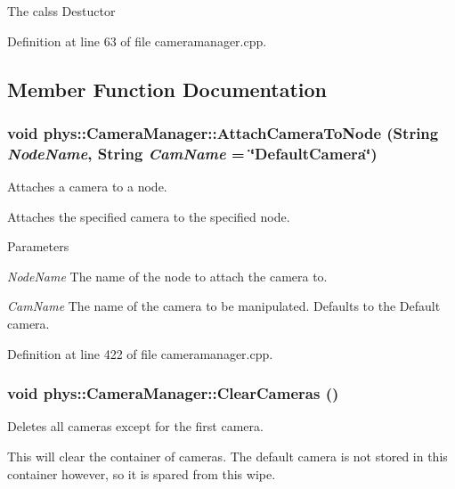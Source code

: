 The calss Destuctor 

Definition at line 63 of file cameramanager.cpp.



\subsection{Member Function Documentation}
\hypertarget{classphys_1_1CameraManager_a1cde365b6cab80a33ddf7046489f7af9}{
\subsubsection[{AttachCameraToNode}]{\setlength{\rightskip}{0pt plus 5cm}void phys::CameraManager::AttachCameraToNode ({\bf String} {\em NodeName}, \/  {\bf String} {\em CamName} = {\ttfamily \char`\"{}DefaultCamera\char`\"{}})}}
\label{d9/d91/classphys_1_1CameraManager_a1cde365b6cab80a33ddf7046489f7af9}


Attaches a camera to a node. 

Attaches the specified camera to the specified node. 
\begin{DoxyParams}{Parameters}
\item[{\em NodeName}]The name of the node to attach the camera to. \item[{\em CamName}]The name of the camera to be manipulated. Defaults to the Default camera. \end{DoxyParams}


Definition at line 422 of file cameramanager.cpp.

\hypertarget{classphys_1_1CameraManager_a76bebee0820fcfa462412cb112b1b874}{
\subsubsection[{ClearCameras}]{\setlength{\rightskip}{0pt plus 5cm}void phys::CameraManager::ClearCameras ()}}
\label{d9/d91/classphys_1_1CameraManager_a76bebee0820fcfa462412cb112b1b874}


Deletes all cameras except for the first camera. 

This will clear the container of cameras. The default camera is not stored in this container however, so it is spared from this wipe. 

